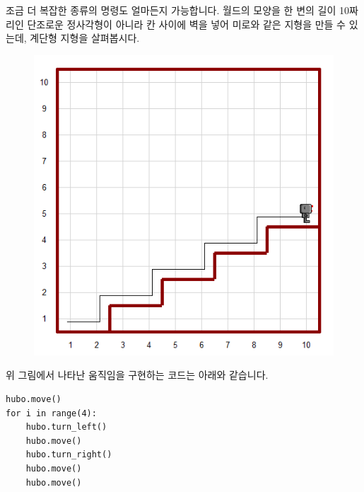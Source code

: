 \documentclass[../main.tex]{subfiles}
\begin{document}
조금 더 복잡한 종류의 명령도 얼마든지 가능합니다.
월드의 모양을 한 변의 길이 10짜리인 단조로운 정사각형이 아니라 칸 사이에 벽을 넣어 미로와 같은 지형을 만들 수 있는데, 계단형 지형을 살펴봅시다.
\begin{figure}[H]
\centering
\includegraphics[width=0.5\linewidth]{"./lectures/lecture4_hubostairs"}
\label{fig:lecture4hubostairs}
\end{figure}
위 그림에서 나타난 움직임을 구현하는 코드는 아래와 같습니다.
\begin{verbatim}
hubo.move()
for i in range(4):
    hubo.turn_left()
    hubo.move()
    hubo.turn_right()
    hubo.move()
    hubo.move()
\end{verbatim}
\end{document}
